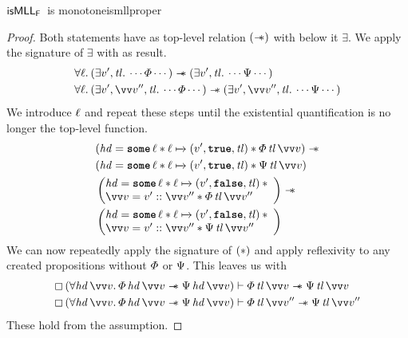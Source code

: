 \documentclass[thesis.tex]{subfiles}
\begin{document}
\begin{example}{$\textsf{\upshape isMLL}_{\textsf{\upshape F}}$\ is monotone}{ismllproper}
\begin{proof}
        Both statements have as top-level relation $(\mathrel{-\!\!\ast})$ with below it $\exists$. We apply the signature of $\exists$ with as result.
        \begin{align*}
             & \All \loc. (\Exists \val', \tl. \cdots \pred \cdots) \wand (\Exists \val', \tl. \cdots \predB \cdots)                               \\
             & \All \loc. (\Exists \val', \vect{\val}'', \tl. \cdots \pred \cdots) \wand (\Exists \val', \vect{\val}'', \tl. \cdots \predB \cdots)
        \end{align*}
        We introduce $\ell$ and repeat these steps until the existential quantification is no longer the top-level function.
        \begin{align*}
             & (\hd = \Some \loc * \loc \fmapsto (\val', \True, \tl) * \pred\, \tl\, \vect{\val}) \wand \\
             & (\hd = \Some \loc * \loc \fmapsto (\val', \True, \tl) * \predB\, \tl\, \vect{\val})      \\
             &
            \left(\begin{array}{@{}l}
                          \hd = \Some \loc * \loc \fmapsto (\val', \False, \tl)\spac * \\
                          \vect{\val} = \val' :: \vect{\val}'' * \pred\, \tl\, \vect{\val}''
                      \end{array}\right)
            \wand                                                                                       \\
             & \left(\begin{array}{@{}l}
                             \hd = \Some \loc * \loc \fmapsto (\val', \False, \tl)\spac * \\
                             \vect{\val} = \val' :: \vect{\val}'' * \predB\, \tl\, \vect{\val}''
                         \end{array}\right)
        \end{align*}
        We can now repeatedly apply the signature of $(*)$ and apply reflexivity to any created propositions without $\varPhi$ or $\Psi$. This leaves us with
        \begin{align*}
            \always{(\All \hd\, \vect{v}. \pred\, \hd\, \vect{v} \wand \predB\, \hd\, \vect{v})} & \proves \pred\, \tl\, \vect{\val} \wand \predB\, \tl\, \vect{\val}     \\
            \always{(\All \hd\, \vect{v}. \pred\, \hd\, \vect{v} \wand \predB\, \hd\, \vect{v})} & \proves \pred\, \tl\, \vect{\val}'' \wand \predB\, \tl\, \vect{\val}''
        \end{align*}
        These hold from the assumption.
    \end{proof}
\end{example}
\end{document}
